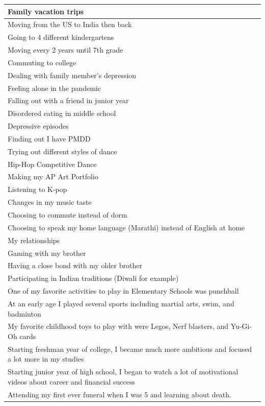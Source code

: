 \documentclass[
  .7em,
  letterpaper,
  DIV=11,
  numbers=noendperiod]{scrartcl}
\begin{document}
\begin{table}
\begin{tabular}{l}
Family vacation trips\\
\hline
Moving from the US to India then back\\
\hline
Going to 4 different kindergartens\\
\hline
Moving every 2 years until 7th grade\\
\hline
Commuting to college\\
\hline
Dealing with family member's depression\\
\hline
Feeling alone in the pandemic\\
\hline
Falling out with a friend in junior year\\
\hline
Disordered eating in middle school\\
\hline
Depressive episodes\\
\hline
Finding out I have PMDD\\
\hline
Trying out different styles of dance\\
\hline
Hip-Hop Competitive Dance\\
\hline
Making my AP Art Portfolio\\
\hline
Listening to K-pop\\
\hline
Changes in my music taste\\
\hline
Choosing to commute instead of dorm\\
\hline
Choosing to speak my home language (Marathi) instead of English at home\\
\hline
My relationships\\
\hline
Gaming with my brother\\
\hline
Having a close bond with my older brother\\
\hline
Participating in Indian traditions (Diwali for example)\\
\hline
One of my favorite activities to play in Elementary Schools was punchball\\
\hline
At an early age I played several sports including martial arts, swim, and badminton\\
\hline
My favorite childhood toys to play with were Legos, Nerf blasters, and  Yu-Gi-Oh cards\\
\hline
Starting freshman year of college, I became much more ambitious and focused a lot more in my studies\\
\hline
Starting junior year of high school, I began to watch a lot of motivational videos about career and financial success\\
\hline
Attending my first ever funeral when I was 5 and learning about death.\\

\end{tabular}
\end{table}
\end{document}

